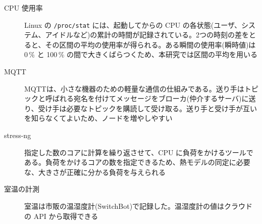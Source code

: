 \begin{description}
  \item[CPU 使用率] Linux の \texttt{/proc/stat} には、起動してからの CPU の各状態(ユーザ、システム、アイドルなど)の累計の時間が記録されている。2つの時刻の差をとると、その区間の平均の使用率が得られる。ある瞬間の使用率(瞬時値)は 0\,\% と 100\,\% の間で大きくばらつくため、本研究では区間の平均を用いる
  \item[MQTT] MQTT\cite{mqtt5}は、小さな機器のための軽量な通信の仕組みである。送り手はトピックと呼ばれる宛名を付けてメッセージをブローカ(仲介するサーバ)に送り、受け手は必要なトピックを購読して受け取る。送り手と受け手が互いを知らなくてよいため、ノードを増やしやすい
  \item[stress-ng] 指定した数のコアに計算を繰り返させて、CPU に負荷をかけるツールである。負荷をかけるコアの数を指定できるため、熱モデルの同定に必要な、大きさが正確に分かる負荷を与えられる
  \item[室温の計測] 室温は市販の温湿度計(SwitchBot)で記録した。温湿度計の値はクラウドの API から取得できる
\end{description}
